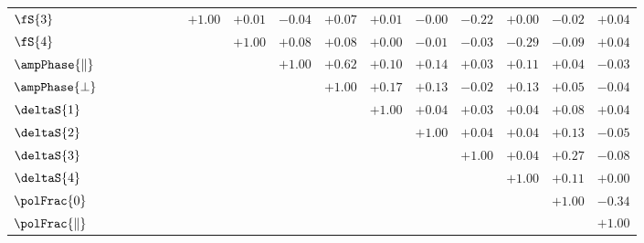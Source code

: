 \begin{table}
\begin{center}
\begin{tabular}{lcccccccccccccccc}
$\fS{3}$                 &           &           &           &           &           &           & $+1.00$      & $+0.01$      & $-0.04$      & $+0.07$      & $+0.01$      & $-0.00$      & $-0.22$      & $+0.00$      & $-0.02$      & $+0.04$    \\
$\fS{4}$                 &           &           &           &           &           &           &           & $+1.00$      & $+0.08$      & $+0.08$      & $+0.00$      & $-0.01$      & $-0.03$      & $-0.29$      & $-0.09$      & $+0.04$    \\
$\ampPhase{\parallel}$   &           &           &           &           &           &           &           &           & $+1.00$      & $+0.62$      & $+0.10$      & $+0.14$      & $+0.03$      & $+0.11$      & $+0.04$      & $-0.03$    \\
$\ampPhase{\perp}$      &           &           &           &           &           &           &           &           &           & $+1.00$      & $+0.17$      & $+0.13$      & $-0.02$      & $+0.13$      & $+0.05$      & $-0.04$    \\
$\deltaS{1}$             &           &           &           &           &           &           &           &           &           &           & $+1.00$      & $+0.04$      & $+0.03$      & $+0.04$      & $+0.08$      & $+0.04$    \\
$\deltaS{2}$             &           &           &           &           &           &           &           &           &           &           &           & $+1.00$      & $+0.04$      & $+0.04$      & $+0.13$      & $-0.05$    \\
$\deltaS{3}$             &           &           &           &           &           &           &           &           &           &           &           &           & $+1.00$      & $+0.04$      & $+0.27$      & $-0.08$    \\
$\deltaS{4}$             &           &           &           &           &           &           &           &           &           &           &           &           &           & $+1.00$      & $+0.11$      & $+0.00$    \\
$\polFrac{0}$            &           &           &           &           &           &           &           &           &           &           &           &           &           &           & $+1.00$      & $-0.34$    \\
$\polFrac{\parallel}$    &           &           &           &           &           &           &           &           &           &           &           &           &           &           &           & $+1.00$    \\
\end{tabular}
\end{center}
\end{table}


